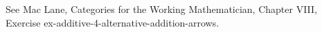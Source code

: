 See Mac Lane, Categories for the Working Mathematician, Chapter VIII, Exercise ex-additive-4-alternative-addition-arrows.
